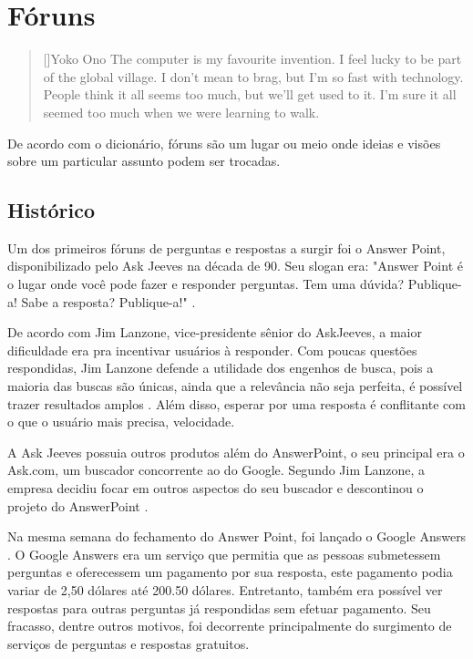 \chapter{Fóruns}
\label{cap:forums}

\begin{quotation}[]{Yoko Ono}
The computer is my favourite invention. I feel lucky to be part of the global village. I don't mean to brag, but I'm so fast with technology. People think it all seems too much, but we'll get used to it. I'm sure it all seemed too much when we were learning to walk.
\end{quotation}

De acordo com o dicionário, fóruns são um lugar ou meio onde ideias e visões sobre um particular assunto podem ser trocadas.

\section{Histórico}
Um dos primeiros fóruns de perguntas e respostas a surgir foi o Answer Point, disponibilizado pelo Ask Jeeves na década de 90. Seu slogan era: "Answer Point é o lugar onde você pode fazer e responder perguntas. Tem uma dúvida? Publique-a! Sabe a resposta? Publique-a!" \cite{websearchhistory}.

 De acordo com Jim Lanzone, vice-presidente sênior do AskJeeves, a maior dificuldade era pra incentivar usuários à responder. Com poucas questões respondidas, Jim Lanzone defende a utilidade dos engenhos de busca, pois a maioria das buscas são únicas, ainda que a relevância não seja perfeita, é possível trazer resultados amplos \cite{websearchhistory}. Além disso, esperar por uma resposta é conflitante com o que o usuário mais precisa, velocidade. 

A Ask Jeeves possuia outros produtos além do AnswerPoint, o seu principal era o Ask.com, um buscador concorrente ao do Google. Segundo Jim Lanzone, a empresa decidiu focar em outros aspectos do seu buscador e descontinou o projeto do AnswerPoint \cite{websearchhistory}.

Na mesma semana do fechamento do Answer Point, foi lançado o Google Answers \cite{googleanswerswiki}. O Google Answers era um serviço que permitia que as pessoas submetessem perguntas e oferecessem um pagamento por sua resposta, este pagamento podia variar de 2,50 dólares até 200.50 dólares. Entretanto, também era possível ver respostas para outras perguntas já respondidas sem efetuar pagamento. Seu fracasso, dentre outros motivos, foi decorrente principalmente do surgimento de serviços de perguntas e respostas gratuitos.

